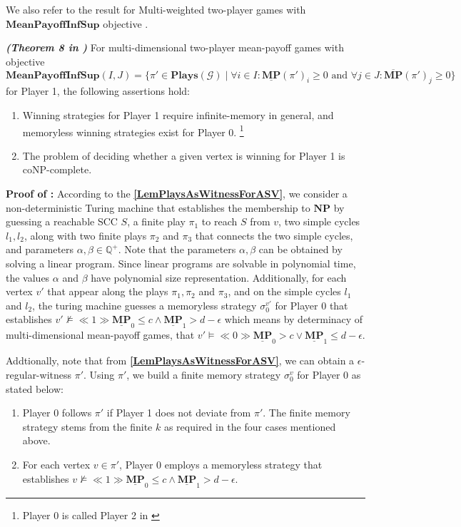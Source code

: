 \noindent We also refer to the result for Multi-weighted two-player games with $\mathbf{MeanPayoffInfSup}$ objective \cite{VCDHRR15}.

\begin{theorem}
    \label{ThmMemlessStrForP2}
    \textbf{\emph{(Theorem 8 in \cite{VCDHRR15})}} For multi-dimensional two-player mean-payoff games with objective \\
    $\mathbf{MeanPayoffInfSup}(I,J) = \{\pi' \in \mathbf{Plays}(\mathcal{G}) \mid \forall i \in I : \underline{\mathbf{MP}}(\pi')_i \geqslant 0 \text{ and } \forall j \in J : \overline{\mathbf{MP}}(\pi')_j \geqslant 0\}$ for Player 1, the following assertions hold:
    \begin{enumerate}
        \item Winning strategies for Player 1 require infinite-memory in general, and memoryless winning strategies exist for Player 0. \footnote{Player 0 is called Player 2 in \cite{FGR20}}
        \item The problem of deciding whether a given vertex is winning for Player 1 is coNP-complete.
    \end{enumerate}
\end{theorem}

\textbf{Proof of :} According to the \textbf{\cref{LemPlaysAsWitnessForASV}}, we consider a non-deterministic Turing machine that establishes the membership to $\mathbf{NP}$ by guessing a reachable SCC $S$, a finite play $\pi_1$ to reach $S$ from $v$, two simple cycles $l_1, l_2$, along with two finite plays $\pi_2$ and $\pi_3$ that connects the two simple cycles, and parameters $\alpha, \beta \in \mathbb{Q}^{+}$. Note that the parameters $\alpha , \beta$ can be obtained by solving a linear program. Since linear programs are solvable in polynomial time, the values $\alpha$ and $\beta$ have polynomial size representation. Additionally, for each vertex $v'$ that appear along the plays $\pi_1, \pi_2$ and $\pi_3$, and on the simple cycles $l_1$ and $l_2$, the turing machine guesses a memoryless strategy $\sigma_0^{v'}$ for Player 0 that establishes $v' \nvDash \ll 1 \gg \underline{\textbf{MP}}_0 \leqslant c \land \underline{\textbf{MP}}_1 > d - \epsilon$ which means by determinacy of multi-dimensional mean-payoff games, that $v' \models \ll 0 \gg \underline{\textbf{MP}}_0 > c \lor \underline{\textbf{MP}}_1 \leqslant d - \epsilon$. 

Addtionally, note that from \textbf{\cref{LemPlaysAsWitnessForASV}}, we can obtain a $\epsilon$-regular-witness $\pi'$. Using $\pi'$, we build a finite memory strategy $\sigma_0^v$ for Player 0 as stated below:
\begin{enumerate}
    \item Player 0 follows $\pi'$ if Player 1 does not deviate from $\pi'$. The finite memory strategy stems from the finite $k$ as required in the four cases mentioned above.
    \item \label{strategy_memoryless} For each vertex $v \in \pi'$, Player 0 employs a memoryless strategy that establishes $v \nvDash \ll 1 \gg \underline{\mathbf{MP}}_0 \leqslant c \land \underline{\mathbf{MP}}_1 > d-\epsilon$.
\end{enumerate}

